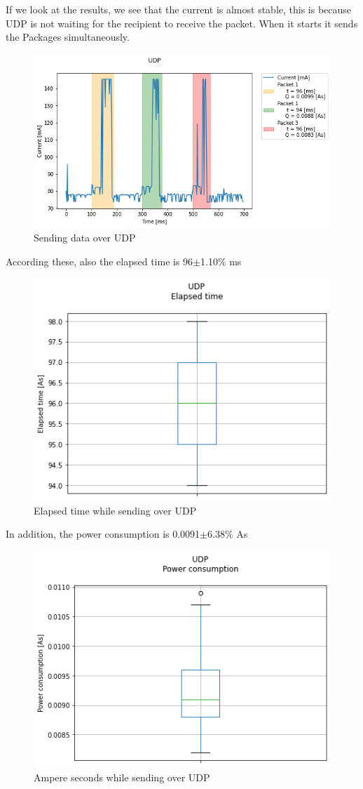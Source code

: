 If we look at the results, we see that the current is almost stable,
this is because UDP is not waiting for the recipient to receive the packet.
When it starts it sends the Packages simultaneously.\linebreak\linebreak
\begin{figure}[H]
\centering
\includegraphics[width = 1 \linewidth]{fig/udp_tcp/udp_s_m.png}
\caption{Sending data over UDP}
\label{fig:udp_s_m}
\end{figure}
According these, also the elapsed time is 96$\pm$1.10\% ms
\linebreak
\begin{figure}[H]
\centering
\includegraphics[width = 0.7 \linewidth]{fig/udp_tcp/udp_boxplot_time.png}
\caption{Elapsed time while sending over UDP}
\label{fig:udp_boxplot_time}
\end{figure}
In addition, the power consumption is 0.0091$\pm$6.38\% As
\linebreak
\begin{figure}[H]
\centering
\includegraphics[width = 0.7 \linewidth]{fig/udp_tcp/udp_boxplot_As.png}
\caption{Ampere seconds while sending over UDP}
\label{fig:udp_boxplot_As}
\end{figure}